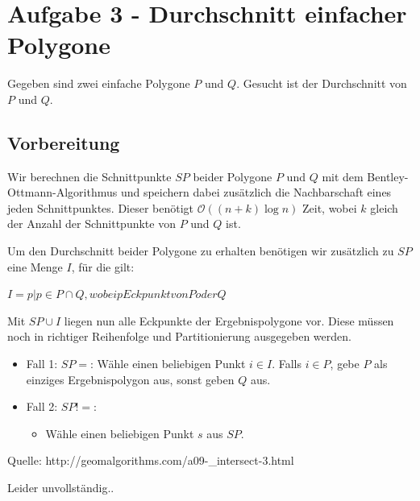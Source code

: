 \documentclass[a4paper]{article}
\begin{document}
\section*{Aufgabe 3 - Durchschnitt einfacher Polygone}

Gegeben sind zwei einfache Polygone $P$ und $Q$. 
Gesucht ist der Durchschnitt von $P$ und $Q$.

\subsection*{Vorbereitung}
Wir berechnen die Schnittpunkte $SP$ beider Polygone $P$ und $Q$ mit dem 
Bentley-Ottmann-Algorithmus und speichern dabei zusätzlich
die Nachbarschaft eines jeden Schnittpunktes. Dieser benötigt $\mathcal{O}((n+k) \log n)$ Zeit, wobei $k$
gleich der Anzahl der Schnittpunkte von $P$ und $Q$ ist. 

Um den Durchschnitt beider Polygone zu erhalten benötigen wir zusätzlich zu $SP$
eine Menge $I$, für die gilt:

$I = {p | p \in P \cap Q, wobei p Eckpunkt von P oder Q}$

Mit $SP \cup I$ liegen nun alle Eckpunkte der Ergebnispolygone vor. 
Diese müssen noch in richtiger Reihenfolge und Partitionierung ausgegeben werden. 

\begin{itemize}
\item Fall 1: $SP = {}$: Wähle einen beliebigen Punkt $i \in I$. Falls $i \in P$, gebe $P$ als einziges
Ergebnispolygon aus, sonst geben $Q$ aus.
\item Fall 2: $SP != {}$: 
\begin{itemize}
	\item Wähle einen beliebigen Punkt $s$ aus $SP$. 
\end{itemize} 
\end{itemize}


Quelle: http://geomalgorithms.com/a09-\_intersect-3.html

Leider unvollständig..




\end{document}
